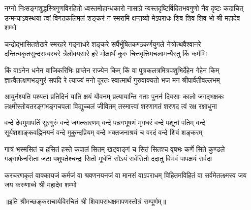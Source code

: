 \fourlineindentedshloka
{नग्नो निःसङ्गशुद्धस्त्रिगुणविरहितो ध्वस्तमोहान्धकारो}
{नासाग्रे न्यस्तदृष्टिर्विदितभवगुणो नैव दृष्टः कदाचित्}
{उन्मन्याऽवस्थया त्वां विगतकलिमलं शङ्करं न स्मरामि}
{क्षन्तव्यो मेऽपराधः शिव शिव शिव भो श्री महादेव शम्भो} %

\fourlineindentedshloka
{चन्द्रोद्भासितशेखरे स्मरहरे गङ्गाधरे शङ्करे}
{सर्पैर्भूषितकण्ठकर्णयुगले नेत्रोत्थवैश्वानरे}
{दन्तित्वकृतसुन्दराम्बरधरे त्रैलोक्यसारे हरे}
{मोक्षार्थं कुरु चित्तवृत्तिमचलामन्यैस्तु किं कर्मभिः} %


\fourlineindentedshloka
{किं वाऽनेन धनेन वाजिकरिभिः प्राप्तेन राज्येन किम्}
{किं वा पुत्रकलत्रमित्रपशुभिर्देहेन गेहेन किम्}
{ज्ञात्वैतत्क्षणभङ्गुरं सपदि रे त्याज्यं मनो दूरतः}
{स्वात्मार्थं गुरुवाक्यतो भज मन श्रीपार्वतीवल्लभम्} %

\fourlineindentedshloka
{आयुर्नश्यति पश्यतां प्रतिदिनं याति क्षयं यौवनम्}
{प्रत्यायान्ति गताः पुनर्न दिवसाः कालो जगद्भक्षकः}
{लक्ष्मीस्तोयतरङ्गभङ्गचपला विद्युच्चलं जीवितम्}
{तस्मात्त्वां शरणागतं शरणद त्वं रक्ष रक्षाधुना} %


\fourlineindentedshloka
{वन्दे देवमुमापतिं सुरगुरुं वन्दे जगत्कारणम्}
{वन्दे पन्नगभूषणं मृगधरं वन्दे पशूनां पतिम्}
{वन्दे सूर्यशशाङ्कवह्निनयनं वन्दे मुकुन्दप्रियम्}
{वन्दे भक्तजनाश्रयं च वरदं वन्दे शिवं शङ्करम्} %

\fourlineindentedshloka
{गात्रं भस्मसितं च हसितं हस्ते कपालं सितम्}
{खट्वाङ्गं च सितं सितश्च वृषभः कर्णे सिते कुण्डले}
{गङ्गाफेनसिता जटा पशुपतेश्चन्द्रः सितो मूर्धनि}
{सोऽयं सर्वसितो ददातु विभवं पापक्षयं सर्वदा} %

\fourlineindentedshloka
{करचरणकृतं वाक्कायजं कर्मजं वा}
{श्रवणनयनजं वा मानसं वाऽपराधम्}
{विहितमविहितं वा सर्वमेतत्क्ष्मस्व}
{जय जय करुणाब्धे श्री महादेव शम्भो} %


॥इति श्रीमच्छङ्कराचार्यविरचितं श्री शिवापराधक्षमापणस्तोत्रं सम्पूर्णम्॥